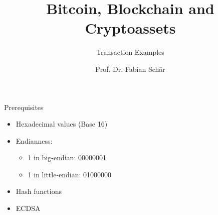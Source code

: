 \documentclass[]{beamer}
\title{Bitcoin, Blockchain and Cryptoassets}
\subtitle{Transaction Examples}
\author{Prof. Dr. Fabian Schär}
\institute{University of Basel}
\begin{document}
\thispagestyle{empty}
\begin{frame}[noframenumbering]
	\titlepage
\end{frame}



\begin{frame}{Prerequisites}
\begin{itemize}
	\item<1->{Hexadecimal values (Base 16)}
	\item<2->{Endianness:}
		\begin{itemize}
			\item<2->{1 in big-endian: 00000001}
			\item<3->{1 in little-endian: 01000000}
		\end{itemize}
	\item<4->{Hash functions}
	\item<5->{ECDSA}\\
\end{itemize}

\end{frame}
\end{document}
